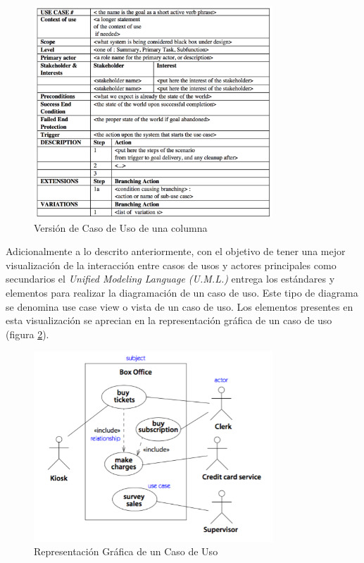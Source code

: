 \begin{figure}[ht]
  \begin{center}
  \includegraphics[width=0.8\textwidth]{./figures/chapter_02/10_use_case_template_one_column_version.png}
  \caption{Versión de Caso de Uso de una columna}
  \label{fig:uses_cases_summary}
  \end{center}
\end{figure}

Adicionalmente a lo descrito anteriormente, con el objetivo de tener una mejor visualización de la interacción entre casos de usos y actores principales como secundarios el \textit{Unified Modeling Language (U.M.L.)} \cite{uml} entrega los estándares y elementos para realizar la diagramación de un caso de uso. Este tipo de diagrama se denomina use case view o vista de un caso de uso. Los elementos presentes en esta visualización se aprecian en la representación gráfica de un caso de uso (figura \ref{fig:use_case_view}).

\begin{figure}[ht]
  \begin{center}
  \includegraphics[width=0.8\textwidth]{./figures/chapter_02/11_use_case_view.png}
  \caption{Representación Gráfica de un Caso de Uso}
  \label{fig:use_case_view}
  \end{center}
\end{figure}

